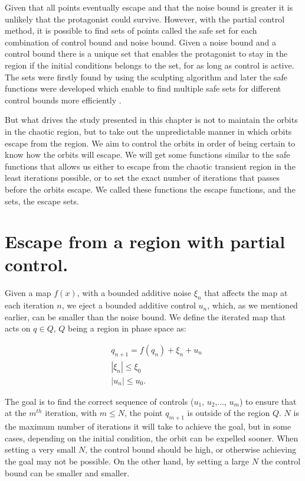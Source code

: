 Given that all points eventually escape and that the noise bound is greater it is unlikely that the protagonist could survive. However, with the partial control method, it is possible to find sets of points called the safe set for each combination of control bound and noise bound. Given a noise bound and a control bound there is a unique set that enables the protagonist to stay in the region if the initial conditions belongs to the set, for as long as control is active. The sets were firstly found by using the sculpting algorithm \cite{Sculpting} and later the safe functions were developed which enable to find multiple safe sets for different control bounds more efficiently \cite{SafeSets}.

But what drives the study presented in this chapter is not to maintain the orbits in the chaotic region, but to take out the unpredictable manner in which orbits escape from the region. We aim to control the orbits in order of being certain to know how the orbits will escape. We will get some functions similar to the safe functions that allows us either to escape from the chaotic transient region in the least iterations possible, or to set the exact number of iterations that passes before the orbits escape. We called these functions the escape functions, and the sets, the escape sets.
 
\section{Escape from a region with partial control.}

Given a map $f(x)$, with a bounded additive noise $\xi_n$ that affects the map at each iteration $n$, we eject a bounded additive control $u_n$, which, as we mentioned earlier, can be smaller than the noise bound. We define the iterated map that acts on $q\in Q$, $Q$ being a region in phase space as:

\begin{equation}
\begin{split}
&q_{n+1}=f(q_n)+\xi_n+u_n \\
&|\xi_n|\leq \xi_0 \\
&|u_n|\leq u_0.
\end{split}
\end{equation}

The goal is to find the correct sequence of controls ($u_1$, $u_2$,..., $u_m$) to ensure that at the $m^{th}$ iteration, with $m \leq N$, the point $q_{m+1}$ is outside of the region $Q$. $N$ is the maximum number of iterations it will take to achieve the goal, but in some cases, depending on the initial condition, the orbit can be expelled sooner. When setting a very small $N$, the control bound should be high, or otherwise achieving the goal may not be possible. On the other hand, by setting a large $N$ the control bound can be smaller and smaller.

